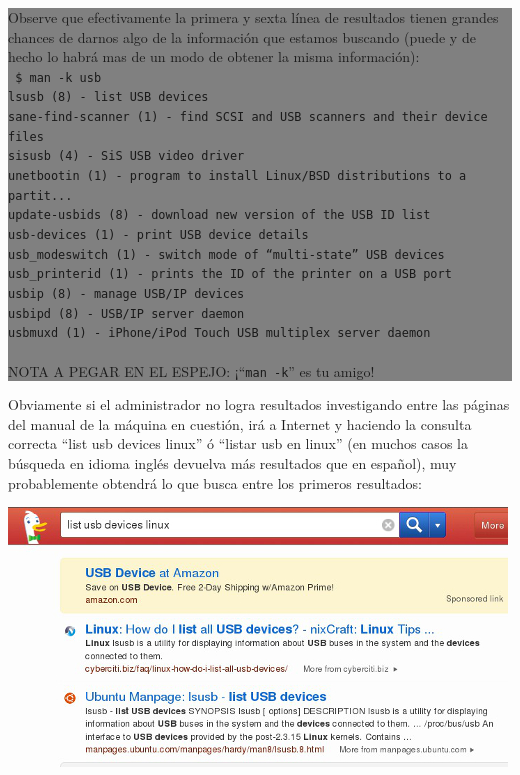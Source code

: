 \documentclass[12pt]{article}
\begin{document}
\colorbox{grey}{\parbox[t]{0.95\linewidth}{ \vspace*{0.5cm} { 
Observe que efectivamente la primera y sexta línea de resultados tienen grandes chances 
de darnos algo de la información que estamos buscando (puede y de hecho lo habrá mas de un 
modo de obtener la misma información): \\ 
{\tt 
\$ man -k usb \\
lsusb (8)            - list USB devices\\
sane-find-scanner (1) - find SCSI and USB scanners and their device files\\
sisusb (4)           - SiS USB video driver\\
unetbootin (1)       - program to install Linux/BSD distributions to a partit...\\
update-usbids (8)    - download new version of the USB ID list\\
usb-devices (1)      - print USB device details\\
usb\_modeswitch (1)   - switch mode of ``multi-state'' USB devices\\
usb\_printerid (1)    - prints the ID of the printer on a USB port\\
usbip (8)            - manage USB/IP devices\\
usbipd (8)           - USB/IP server daemon\\
usbmuxd (1)          - iPhone/iPod Touch USB multiplex server daemon\\ \\
}
NOTA A PEGAR EN EL ESPEJO: ¡``{\tt man -k}'' es tu amigo!
} \vspace*{0.5cm} } } 

Obviamente si el administrador no logra resultados investigando entre las 
páginas del manual de la máquina en cuestión, irá a Internet y haciendo la consulta
correcta ``list usb devices linux'' ó ``listar usb en linux'' (en 
muchos casos la búsqueda en idioma inglés devuelva más resultados que en español),  
muy probablemente obtendrá lo que busca entre los primeros resultados: 

\begin{center}
 \includegraphics{lsusb.jpg}
\end{center}
\end{document}
